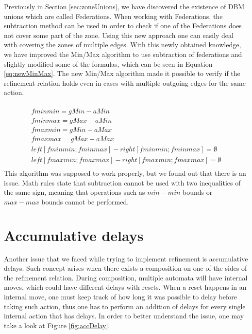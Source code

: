 Previously in Section \ref{sec:zoneUnions}, we have discovered the existence of DBM unions which are called Federations. When working with Federations, the subtraction method can be used in order to check if one of the Federations does not cover some part of the zone. Using this new approach one can easily deal with covering the zones of multiple edges. With this newly obtained knowledge, we have improved the Min/Max algorithm to use subtraction of federations and slightly modified some of the formulas, which can be seen in Equation \ref{eq:newMinMax}. The new Min/Max algorithm made it possible to verify if the refinement relation holds even in cases with multiple outgoing edges for the same action.

\begin{multline}
\label{eq:newMinMax}
\\
fminmin = gMin - aMin\\
fminmax = gMax - aMin\\
fmaxmin = gMin - aMax\\
fmaxmax = gMax - aMax\\
left[fminmin;fminmax] - right[fminmin;fminmax] = \emptyset\\
left[fmaxmin;fmaxmax] - right[fmaxmin;fmaxmax] = \emptyset\\
\end{multline}
This algorithm was supposed to work properly, but we found out that there is an issue. Math rules state that subtraction cannot be used with two inequalities of the same sign, meaning that operations such as $min - min$ bounds or $max - max$ bounds cannot be performed.

\section{Accumulative delays} \label{sec:accumDelays}
Another issue that we faced while trying to implement refinement is accumulative delays. Such concept arises when there exists a composition on one of the sides of the refinement relation. During composition, multiple automata will have internal moves, which could have different delays with resets. When a reset happens in an internal move, one must keep track of how long it was possible to delay before taking such action, thus one has to perform an addition of delays for every single internal action that has delays. In order to better understand the issue, one may take a look at Figure \ref{fig:accDelay}.

